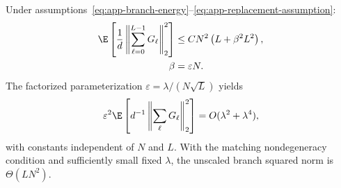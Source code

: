 \begin{theorem}
\label{thm:Llayer-formal}
Under assumptions~\eqref{eq:app-branch-energy}--\eqref{eq:app-replacement-assumption}:
\[
  \begin{aligned}
  \E\left[
    \frac{1}{d}\left\|\sum_{\ell=0}^{L-1}G_\ell\right\|_2^2
  \right]
  &\le C N^2\left(L+\beta^2L^2\right),\\
  \beta&=\varepsilon N.
  \end{aligned}
\]
The factorized parameterization $\varepsilon = \lambda/(N\sqrt{L})$ yields
\[
  \varepsilon^2\E\left[d^{-1}\left\|\sum_{\ell}G_\ell\right\|_2^2\right]
  =
  O(\lambda^2+\lambda^4),
\]
with constants independent of $N$ and $L$.
With the matching nondegeneracy condition and sufficiently small fixed $\lambda$, the unscaled branch squared norm is $\Theta(LN^2)$.
\end{theorem}

